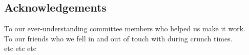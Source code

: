 \pagestyle{plain}
\begin{center}


\section*{Acknowledgements}

To our ever-understanding committee members who helped us make it work.\\
To our friends who we fell in and out of touch with during crunch times.\\
etc etc etc
\end{center}



\cleardoublepage
